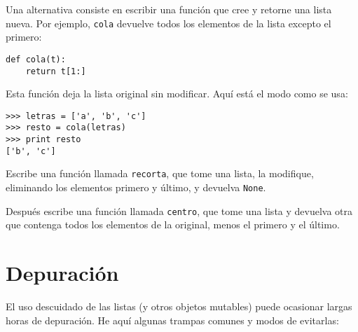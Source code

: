 
Una alternativa consiste en escribir una función que cree y
retorne una lista nueva. Por ejemplo,
{\tt cola} devuelve todos los elementos de la lista
excepto el primero:

\beforeverb
\begin{verbatim}
def cola(t):
    return t[1:]
\end{verbatim}
\afterverb
%
Esta función deja la lista original sin modificar.
Aquí está el modo como se usa:

\beforeverb
\begin{verbatim}
>>> letras = ['a', 'b', 'c']
>>> resto = cola(letras)
>>> print resto
['b', 'c']
\end{verbatim}
\afterverb


\begin{ex}

Escribe una función llamada {\tt recorta}, que tome una lista, la
modifique, eliminando los elementos primero y último, y devuelva {\tt None}.

Después escribe una función llamada {\tt centro}, que tome una lista y
devuelva otra que contenga todos los elementos de la original,
menos el primero y el último.

\end{ex}


\section{Depuración}

El uso descuidado de las listas (y otros objetos mutables)
puede ocasionar largas horas de depuración. He aquí algunas
trampas comunes y modos de evitarlas:

